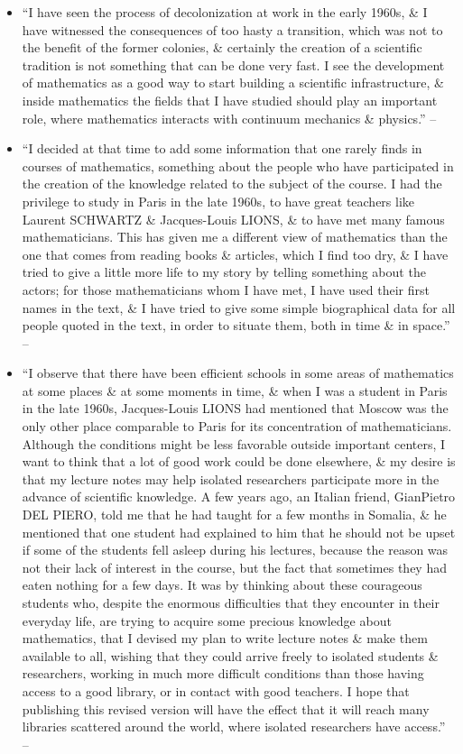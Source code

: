 \documentclass{article}
\begin{document}
\begin{enumerate}
\begin{itemize}
		\item ``I have seen the process of decolonization at work in the early 1960s, \& I have witnessed the consequences of too hasty a transition, which was not to the benefit of the former colonies, \& certainly the creation of a scientific tradition is not something that can be done very fast. I see the development of mathematics as a good way to start building a scientific infrastructure, \& inside mathematics the fields that I have studied should play an important role, where mathematics interacts with continuum mechanics \& physics.'' -- \cite[Preface, pp. ix--x]{Tartar2006}
		\item ``I decided at that time to add some information that one rarely finds in courses of mathematics, something about the people who have participated in the creation of the knowledge related to the subject of the course. I had the privilege to study in Paris in the late 1960s, to have great teachers like Laurent SCHWARTZ \& Jacques-Louis LIONS, \& to have met many famous mathematicians. This has given me a different view of mathematics than the one that comes from reading books \& articles, which I find too dry, \& I have tried to give a little more life to my story by telling something about the actors; for those mathematicians whom I have met, I have used their first names in the text, \& I have tried to give some simple biographical data for all people quoted in the text, in order to situate them, both in time \& in space.'' -- \cite[Preface, p. x]{Tartar2006}
		\item ``I observe that there have been efficient schools in some areas of mathematics at some places \& at some moments in time, \& when I was a student in Paris in the late 1960s, Jacques-Louis LIONS had mentioned that Moscow was the only other place comparable to Paris for its concentration of mathematicians. Although the conditions might be less favorable outside important centers, I want to think that a lot of good work could be done elsewhere, \& my desire is that my lecture notes may help isolated researchers participate more in the advance of scientific knowledge. A few years ago, an Italian friend, GianPietro DEL PIERO, told me that he had taught for a few months in Somalia, \& he mentioned that one student had explained to him that he should not be upset if some of the students fell asleep during his lectures, because the reason was not their lack of interest in the course, but the fact that sometimes they had eaten nothing for a few days. It was by thinking about these courageous students who, despite the enormous difficulties that they encounter in their everyday life, are trying to acquire some precious knowledge about mathematics, that I devised my plan to write lecture notes \& make them available to all, wishing that they could arrive freely to isolated students \& researchers, working in much more difficult conditions than those having access to a good library, or in contact with good teachers. I hope that publishing this revised version will have the effect that it will reach many libraries scattered around the world, where isolated researchers have access.'' -- \cite[Preface, p. xi]{Tartar2006}

\end{itemize}
\end{enumerate}
\end{document}
